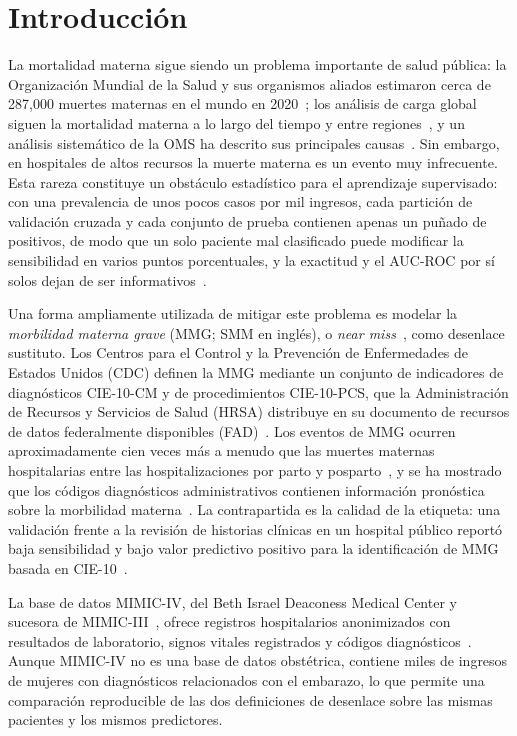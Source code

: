 \documentclass[healthcare,article,submit,pdftex,moreauthors]{Definitions/mdpi_es}
\begin{document}
\section{Introducción}
La mortalidad materna sigue siendo un problema importante de salud pública: la
Organización Mundial de la Salud y sus organismos aliados estimaron cerca de 287{,}000
muertes maternas en el mundo en 2020~\cite{WHO2023MMR}; los análisis de carga global siguen la mortalidad materna a lo largo del tiempo y entre regiones~\cite{Kassebaum2016GBD}, y un análisis sistemático de la OMS ha descrito sus principales causas~\cite{Say2014Causes}. Sin embargo, en hospitales de
altos recursos la muerte materna es un evento muy infrecuente. Esta rareza constituye un
obstáculo estadístico para el aprendizaje supervisado: con una prevalencia de unos pocos
casos por mil ingresos, cada partición de validación cruzada y cada conjunto de prueba
contienen apenas un puñado de positivos, de modo que un solo paciente mal clasificado
puede modificar la sensibilidad en varios puntos porcentuales, y la exactitud y el
AUC-ROC por sí solos dejan de ser informativos~\cite{Marshall2023Imbalance,Saito2015PR}.

Una forma ampliamente utilizada de mitigar este problema es modelar la
\emph{morbilidad materna grave} (MMG; SMM en inglés), o \emph{near miss}~\cite{Say2009NearMiss}, como
desenlace sustituto. Los Centros para el Control y la Prevención de Enfermedades de
Estados Unidos (CDC) definen la MMG mediante un conjunto de indicadores de
diagnósticos CIE-10-CM y de procedimientos CIE-10-PCS, que la Administración de
Recursos y Servicios de Salud (HRSA) distribuye en su documento de recursos de datos
federalmente disponibles (FAD)~\cite{CDC2023SMM,HRSA2023FAD}. Los eventos de MMG
ocurren aproximadamente cien veces más a menudo que las muertes maternas hospitalarias
entre las hospitalizaciones por parto y posparto~\cite{Callaghan2012SMM}, y se ha
mostrado que los códigos diagnósticos administrativos contienen información pronóstica
sobre la morbilidad materna~\cite{Clapp2021Prenatal}. La contrapartida es la calidad de
la etiqueta: una validación frente a la revisión de historias clínicas en un hospital
público reportó baja sensibilidad y bajo valor predictivo positivo para la
identificación de MMG basada en CIE-10~\cite{Boulet2024ICD10SMM}.

La base de datos MIMIC-IV, del Beth Israel Deaconess Medical Center y sucesora de MIMIC-III~\cite{Johnson2016MIMICIII}, ofrece registros
hospitalarios anonimizados con resultados de laboratorio, signos vitales registrados y
códigos diagnósticos~\cite{Johnson2023MIMICIV,Goldberger2000PhysioNet}. Aunque MIMIC-IV
no es una base de datos obstétrica, contiene miles de ingresos de mujeres con
diagnósticos relacionados con el embarazo, lo que permite una comparación reproducible
de las dos definiciones de desenlace sobre las mismas pacientes y los mismos
predictores.
\end{document}
